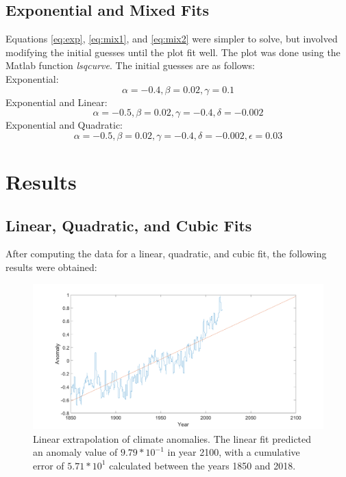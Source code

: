 \documentclass[11pt]{article}
\begin{document}
\subsection{ Exponential and Mixed Fits}
Equations \eqref{eq:exp}, \eqref{eq:mix1}, and \eqref{eq:mix2} were simpler to solve, but involved modifying the initial guesses until the plot fit well. The plot was done using the Matlab function \textit{lsqcurve}. The initial guesses are as follows:\\
Exponential:
\[ \alpha = -0.4, \beta = 0.02, \gamma = 0.1 \]
Exponential and Linear:
\[ \alpha = -0.5, \beta = 0.02, \gamma = -0.4, \delta = -0.002 \]
Exponential and Quadratic:
\[ \alpha = -0.5, \beta = 0.02, \gamma = -0.4, \delta = -0.002, \epsilon = 0.03 \]

\section{Results}
\subsection{ Linear, Quadratic, and Cubic Fits}
After computing the data for a linear, quadratic, and cubic fit, the following results were obtained:

\begin{figure}[H]
    \centering
    \includegraphics[width=\textwidth]{linear.png}
    \caption{Linear extrapolation of climate anomalies. The linear fit predicted an anomaly value of $9.79*10^{-1}$ in year 2100, with a cumulative error of $5.71*10^{1}$ calculated between the years 1850 and 2018.}
    \label{fig:linear}
\end{figure}
\end{document}
